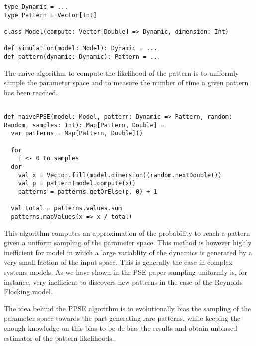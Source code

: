 \documentclass[10pt,a4paper]{article}
\theoremstyle{definition}
\theoremstyle{remark}
\begin{document}
\begin{lstlisting}[caption={Model and pattern signatures},label={lst:pattern}]
type Dynamic = ...
type Pattern = Vector[Int]

class Model(compute: Vector[Double] => Dynamic, dimension: Int)

def simulation(model: Model): Dynamic = ...
def pattern(dynamic: Dynamic): Pattern = ...
\end{lstlisting}

The naive algorithm to compute the likelihood of the pattern is to uniformly sample the parameter space and to measure the number of time a given pattern has been reached. 

\begin{lstlisting}[caption={Naive PPSE},label={lst:pattern}]

def naivePPSE(model: Model, pattern: Dynamic => Pattern, random: Random, samples: Int): Map[Pattern, Double] = 
  var patterns = Map[Pattern, Double]()
  
  for 
    i <- 0 to samples
  dor
    val x = Vector.fill(model.dimension)(random.nextDouble())
    val p = pattern(model.compute(x))
    patterns = patterns.getOrElse(p, 0) + 1
  
  val total = patterns.values.sum
  patterns.mapValues(x => x / total)
\end{lstlisting}

This algorithm computes an approximation of the probability to reach a pattern given a uniform sampling of the parameter space. This method is however highly inefficient for model in which a large variablity of the dynamics is generated by a very small faction of the input space. This is generally the case in complex systems models. As we have shown in the PSE paper sampling uniformly is, for instance, very inefficient to discovers new patterns in the case of the Reynolds Flocking model.

The idea behind the PPSE algorithm is to evolutionally bias the sampling of the parameter space towards the part generating rare patterns, while keeping the enough knowledge on this bias to be de-bias the results and obtain unbiased estimator of the pattern likelihoods.
\end{document}
